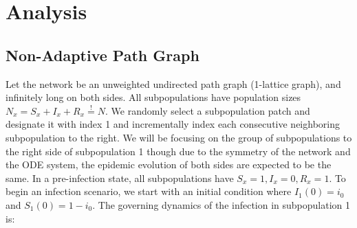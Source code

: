% 

\section{Analysis}
\subsection{Non-Adaptive Path Graph}
\begin{center}
\end{center}
Let the network be an unweighted undirected path graph (1-lattice graph),  and infinitely long on both sides. All subpopulations have population sizes $N_x=S_x+I_x+R_x\stackrel{!}{=}N$. We randomly select a subpopulation patch and designate it with index 1 and incrementally index each consecutive neighboring subpopulation to the right. We will be focusing on the group of subpopulations to the right side of subpopulation 1 though due to the symmetry of the network and the ODE system, the epidemic evolution of both sides are expected to be the same. In a pre-infection state, all subpopulations have $S_x=1,I_x=0,R_x=1$. To begin an infection scenario, we start with an initial condition where $I_1(0)=i_0$ and $S_1(0)=1-i_0$. 
The governing dynamics of the infection in subpopulation 1 is:

